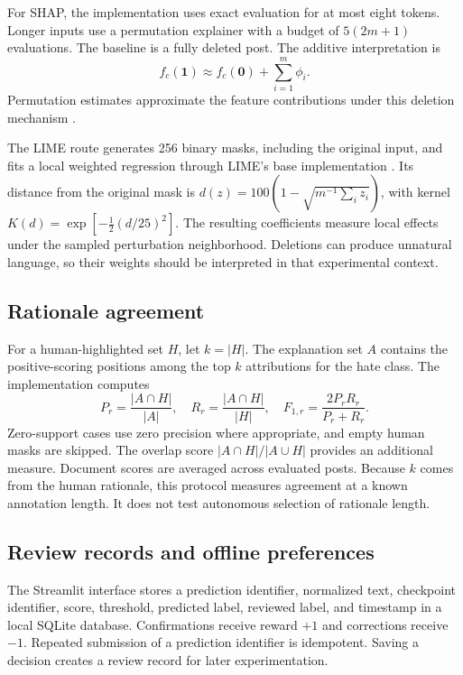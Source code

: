 \documentclass[11pt,a4paper]{article}
\begin{document}
For SHAP, the implementation uses exact evaluation for at most eight tokens.
Longer inputs use a permutation explainer with a budget of
$5(2m+1)$ evaluations. The baseline is a fully deleted post. The additive
interpretation is
\begin{equation}
f_c(\mathbf{1})\approx f_c(\mathbf{0})+\sum_{i=1}^{m}\phi_i.
\end{equation}
Permutation estimates approximate the feature contributions under this
deletion mechanism \cite{shap}.

The LIME route generates 256 binary masks, including the original input, and
fits a local weighted regression through LIME's base implementation
\cite{lime}. Its distance from the original mask is
$d(z)=100(1-\sqrt{m^{-1}\sum_i z_i})$, with kernel
$K(d)=\exp[-\tfrac12(d/25)^2]$. The resulting coefficients measure local effects
under the sampled perturbation neighborhood. Deletions can produce unnatural
language, so their weights should be interpreted in that experimental context.

\subsection{Rationale agreement}
For a human-highlighted set $H$, let $k=|H|$. The explanation set $A$ contains
the positive-scoring positions among the top $k$ attributions for the hate
class. The implementation computes
\begin{equation}
P_r=\frac{|A\cap H|}{|A|},\quad
R_r=\frac{|A\cap H|}{|H|},\quad
F_{1,r}=\frac{2P_rR_r}{P_r+R_r}.
\end{equation}
Zero-support cases use zero precision where appropriate, and empty human masks
are skipped. The overlap score $|A\cap H|/|A\cup H|$ provides an additional
measure. Document scores are averaged across evaluated posts. Because $k$
comes from the human rationale, this protocol measures agreement at a known
annotation length. It does not test autonomous selection of rationale length.

\subsection{Review records and offline preferences}
The Streamlit interface stores a prediction identifier, normalized text,
checkpoint identifier, score, threshold, predicted label, reviewed label, and
timestamp in a local SQLite database. Confirmations receive reward $+1$ and
corrections receive $-1$. Repeated submission of a prediction identifier is
idempotent. Saving a decision creates a review record for later experimentation.
\end{document}
